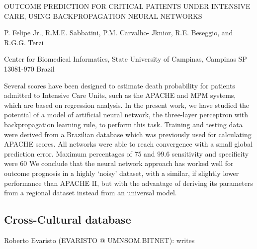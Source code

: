     OUTCOME PREDICTION FOR CRITICAL PATIENTS UNDER INTENSIVE
         CARE, USING BACKPROPAGATION NEURAL NETWORKS

         P. Felipe Jr., R.M.E. Sabbatini, P.M. Carvalho-
           Jknior, R.E. Beseggio, and R.G.G. Terzi

   Center for Biomedical Informatics, State University of
            Campinas, Campinas SP 13081-970 Brazil

Several scores have been designed to estimate death
probability for patients admitted to Intensive Care Units,
such as the APACHE and MPM systems, which are based on
regression analysis. In the present work, we have studied
the potential of a model of artificial neural network, the
three-layer perceptron with backpropagation learning rule,
to perform this task. Training and testing data were derived
from a Brazilian database which was previously used for
calculating APACHE scores. All networks were able to reach
convergence with a small global prediction error. Maximum
percentages of 75%
and 99.6 %
sensitivity and specificity were 60%
We conclude that the neural network approach has worked well
for outcome prognosis in a highly `noisy' dataset, with a
similar, if slightly lower performance than APACHE II, but
with the advantage of deriving its parameters from a
regional dataset instead from an universal model.

\subsection{Cross-Cultural database}
Roberto Evaristo (EVARISTO @ UMNSOM.BITNET): writes

